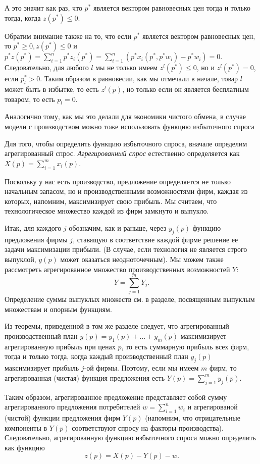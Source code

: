 А это значит как раз, что $p^*$ является  вектором равновесных цен тогда и только тогда, когда
$z(p^*)\leq0$.

Обратим внимание также на то, что если $p^*$ является вектором равновесных цен, то
$p^*\geq0, z(p^*)\leq0$ и $p^*z(p^*)=\sum^n_{i=1}p^*z_i(p^*)=
\sum^n_{i=1}(p^*x_i(p^*,p^*w_i)-p^*w_i)=0.$ Следовательно,
для любого $l$ мы не только имеем $z^l(p^*)\leq0$, но и
$z^l(p^*)=0$, если $p^*_l>0.$ Таким образом в равновесии, как мы отмечали в начале,
товар $l$ может быть в избытке, то есть $z^l(p)$, но только если он является бесплатным
товаром, то есть $p_l=0$.


Аналогично тому, как мы это делали для экономики чистого обмена, в случае модели с
производством можно тоже использовать функцию избыточного спроса

Для того, чтобы определить функцию избыточного спроса, вначале определим агрегированный спрос.
\emph{Агрегированный спрос} естественно определяется как $X(p)=\sum^m_{i=1}x_i(p)$.

Поскольку у нас есть производство, предложение определяется не только начальным запасом,
но и производственными возможностями фирм, каждая из которых, напомним,
максимизирует свою прибыль. Мы считаем, что технологическое множество каждой из фирм
замкнуто и выпукло.

Итак, для каждого $j$ обозначим, как и раньше, через $y_j(p)$
функцию предложения фирмы $j$, ставящую в соответствие каждой фирме
решение ее задачи максимизации прибыли. (В случае, если технология не является строго выпуклой,
$y(p)$ может оказаться неодноточечным).
Мы можем также рассмотреть агрегированное множество производственных возможностей $Y$:
$$
Y=\sum^m_{j=1}Y_j.
$$
Определение суммы выпуклых множеств см. в разделе, посвященным выпуклым
множествам и опорным функциям.

Из теоремы, приведенной в том же разделе следует, что
агрегированный производственный план $y(p)=y_1(p)+\ldots+y_m(p)$ максимизирует
агрегированную прибыль при ценах $p$, то есть суммарную прибыль всех фирм,
тогда и только тогда, когда каждый
производственный план $y_j(p)$ максимизирует прибыль $j$-ой фирмы. Поэтому,
если мы имеем $m$ фирм, то агрегированная
(чистая) функция предложения есть $Y(p)=\sum^m_{j=1}y_j(p)$.

Таким образом, агрегированное
предложение представляет собой сумму агрегированного предложения
потребителей $w=\sum^n_{i=1}w_i$ и агрегированой (чистой) функции
предложения фирм $Y(p)$ (напомним, что отрицательные компоненты
в $Y(p)$ соответствуют спросу на факторы производства).
Следовательно, агрегированную функцию
избыточного спроса можно определить как функцию
$$
z(p)=X(p)-Y(p)-w.
$$

